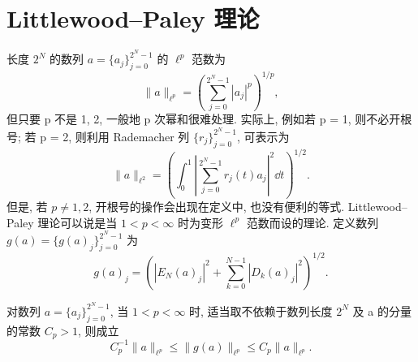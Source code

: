
\section{Littlewood--Paley 理论}\label{sec:1.9}

长度 $2^{N}$ 的数列 $a = \{a_{j}\}_{j=0}^{2^{N}-1}$ 的 $\ell^{p}$ 范数为
\[
\|a\|_{\ell^{p}} = \left(\sum_{j=0}^{2^{N}-1}|a_{j}|^{p}\right)^{1/p},
\]
但只要 p 不是 1, 2, 一般地 p 次幂和很难处理. 实际上, 例如若 p = 1, 则不必开根号; 若 p = 2, 则利用 Rademacher 列 $\{r_{j}\}_{j=0}^{2^{N}-1}$, 可表示为
\[
\|a\|_{\ell^{2}} = \left(\int_{0}^{1}\left|\sum_{j=0}^{2^{N}-1}r_{j}(t)a_{j}\right|^{2}\dd t\right)^{1/2}.
\]
但是, 若 $p \neq 1, 2$, 开根号的操作会出现在定义中, 也没有便利的等式. Littlewood--Paley 理论可以说是当 $1 < p < \infty$ 时为变形 $\ell^{p}$ 范数而设的理论. 定义数列 $g(a) = \{g(a)_{j}\}_{j=0}^{2^{N}-1}$ 为
\[
g(a)_{j} = \left(|E_{N}(a)_{j}|^{2} + \sum_{k=0}^{N-1}|D_{k}(a)_{j}|^{2}\right)^{1/2}.
\]

\begin{theorem}\label{thm:1.13}
对数列 $a = \{a_{j}\}_{j=0}^{2^{N}-1}$, 当 $1 < p < \infty$ 时, 适当取不依赖于数列长度 $2^{N}$ 及 a 的分量的常数 $C_{p} > 1$, 则成立
\[
C_{p}^{-1}\|a\|_{\ell^{p}} \leq \|g(a)\|_{\ell^{p}} \leq C_{p}\|a\|_{\ell^{p}}.
\]
\end{theorem}

